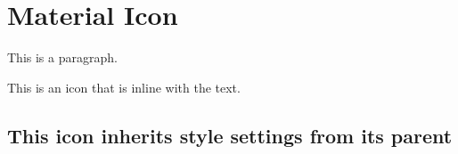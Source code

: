 
\chapter{\label{material-icon}Material Icon}
\par This is a paragraph.
\par {}
\par This is an icon  that is inline with the text.
\section{\label{this-icon-inherits-style-settings-from-its-parent}This icon  inherits style settings from its parent}